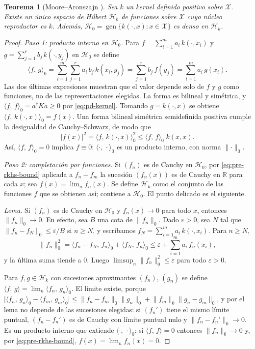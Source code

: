 \documentclass[11pt,a4paper]{article}
\newcommand{\R}{\mathbb{R}}
\newcommand{\X}{\mathcal{X}}
\newcommand{\Hk}{\mathcal{H}}
\newcommand{\dg}{\dagger}                         %
\newcommand{\inner}[2]{\langle #1,\, #2\rangle}
\newcommand{\norm}[1]{\lVert #1\rVert}
\newcommand{\abs}[1]{\lvert #1\rvert}
\DeclareMathOperator{\gen}{gen}
\theoremstyle{plain}
\newtheorem{teorema}{Teorema}[section]
\theoremstyle{definition}
\theoremstyle{remark}
\numberwithin{equation}{section}
\begin{document}
\begin{teorema}[Moore--Aronszajn \cite{aronszajn1950}]\label{teo:moore}
Sea $k$ un kernel definido positivo sobre $\X$. Existe un único espacio de Hilbert $\Hk_k$ de
funciones sobre $\X$ cuyo núcleo reproductor es $k$. Además,
$\Hk_0=\gen\{k(\cdot,x):x\in\X\}$ es denso en $\Hk_k$.
\end{teorema}
\begin{proof}
\emph{Paso 1: producto interno en $\Hk_0$.} Para $f=\sum_{i=1}^m a_i\,k(\cdot,x_i)$ y
$g=\sum_{j=1}^r b_j\,k(\cdot,y_j)$ en $\Hk_0$ se define
\begin{equation}\label{eq:pre-rkhs-inner}
  \inner{f}{g}_0=\sum_{i=1}^m\sum_{j=1}^r a_i\,b_j\,k(x_i,y_j)
  =\sum_{j=1}^r b_j\,f(y_j)=\sum_{i=1}^m a_i\,g(x_i).
\end{equation}
Las dos últimas expresiones muestran que el valor depende solo de $f$ y $g$ como funciones,
no de las representaciones elegidas. La forma es bilineal y simétrica, y
$\inner{f}{f}_0=a^{\dg}Ka\ge0$ por \eqref{eq:pd-kernel}. Tomando $g=k(\cdot,x)$ se obtiene
$\inner{f}{k(\cdot,x)}_0=f(x)$. Una forma bilineal simétrica semidefinida positiva cumple la
desigualdad de Cauchy--Schwarz, de modo que
\begin{equation}\label{eq:pre-rkhs-bound}
  \abs{f(x)}^2=\inner{f}{k(\cdot,x)}_0^2\le\inner{f}{f}_0\;k(x,x).
\end{equation}
Así, $\inner{f}{f}_0=0$ implica $f\equiv0$: $\inner{\cdot}{\cdot}_0$ es un producto interno,
con norma $\norm{\cdot}_0$.

\emph{Paso 2: completación por funciones.} Si $(f_n)$ es de Cauchy en $\Hk_0$, por
\eqref{eq:pre-rkhs-bound} aplicada a $f_n-f_m$ la sucesión $(f_n(x))$ es de Cauchy en $\R$
para cada $x$; sea $f(x)=\lim_n f_n(x)$. Se define $\Hk_k$ como el conjunto de las funciones
$f$ que se obtienen así; contiene a $\Hk_0$. El punto delicado es el siguiente.

\emph{Lema.} Si $(f_n)$ es de Cauchy en $\Hk_0$ y $f_n(x)\to0$ para todo $x$, entonces
$\norm{f_n}_0\to0$. En efecto, sea $B$ una cota de $\norm{f_n}_0$. Dado $\varepsilon>0$, sea
$N$ tal que $\norm{f_n-f_N}_0\le\varepsilon/B$ si $n\ge N$, y escribamos
$f_N=\sum_{i=1}^m a_i\,k(\cdot,x_i)$. Para $n\ge N$,
\[
  \norm{f_n}_0^2=\inner{f_n-f_N}{f_n}_0+\inner{f_N}{f_n}_0
  \le\varepsilon+\sum_{i=1}^m a_i\,f_n(x_i),
\]
y la última suma tiende a $0$. Luego $\limsup_n\norm{f_n}_0^2\le\varepsilon$ para todo
$\varepsilon>0$.

Para $f,g\in\Hk_k$ con sucesiones aproximantes $(f_n)$, $(g_n)$ se define
$\inner{f}{g}=\lim_n\inner{f_n}{g_n}_0$. El límite existe, porque
$\abs{\inner{f_n}{g_n}_0-\inner{f_m}{g_m}_0}\le\norm{f_n-f_m}_0\norm{g_n}_0
+\norm{f_m}_0\norm{g_n-g_m}_0$, y por el lema no depende de las sucesiones elegidas: si
$(f_n')$ tiene el mismo límite puntual, $(f_n-f_n')$ es de Cauchy con límite puntual nulo y
$\norm{f_n-f_n'}_0\to0$. Es un producto interno que extiende $\inner{\cdot}{\cdot}_0$: si
$\inner{f}{f}=0$ entonces $\norm{f_n}_0\to0$ y, por \eqref{eq:pre-rkhs-bound},
$f(x)=\lim_n f_n(x)=0$.


\end{proof}
\end{document}

